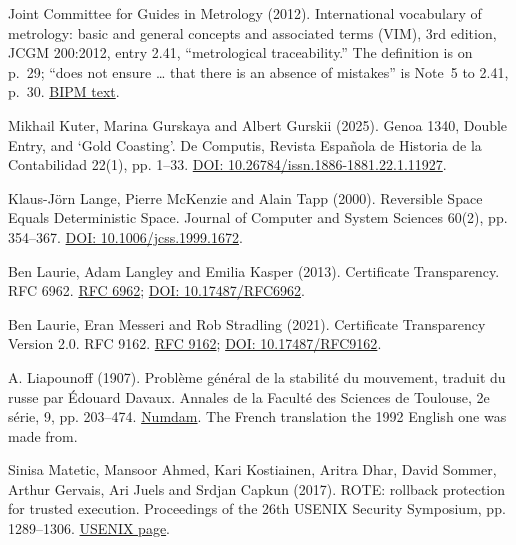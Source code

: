 \documentclass[11pt,twoside]{article}
\theoremstyle{thielethm}
\theoremstyle{thieledef}
\theoremstyle{thieledef}
\theoremstyle{thieledef}
\theoremstyle{thielethm}
\theoremstyle{thieleobs}
\theoremstyle{thielethm}
\begin{document}
\noindent Joint Committee for Guides in Metrology (2012). International vocabulary of metrology: basic and general concepts and associated terms (VIM), 3rd edition, JCGM 200:2012, entry 2.41, ``metrological traceability.'' The definition is on p.~29; ``does not ensure \ldots{} that there is an absence of mistakes'' is Note~5 to 2.41, p.~30. \href{https://www.bipm.org/documents/20126/2071204/JCGM_200_2012.pdf}{BIPM text}.
\par\medskip

\noindent Mikhail Kuter, Marina Gurskaya and Albert Gurskii (2025). Genoa 1340, Double Entry, and `Gold Coasting'. De Computis, Revista Española de Historia de la Contabilidad 22(1), pp. 1--33. \href{https://doi.org/10.26784/issn.1886-1881.22.1.11927}{DOI: 10.26784/issn.1886-1881.22.1.11927}.
\par\medskip

\noindent Klaus-J\"orn Lange, Pierre McKenzie and Alain Tapp (2000). Reversible Space Equals Deterministic Space. Journal of Computer and System Sciences 60(2), pp. 354--367. \href{https://doi.org/10.1006/jcss.1999.1672}{DOI: 10.1006/jcss.1999.1672}.
\par\medskip

\noindent Ben Laurie, Adam Langley and Emilia Kasper (2013). Certificate Transparency. RFC 6962. \href{https://www.rfc-editor.org/rfc/rfc6962.html}{RFC 6962}; \href{https://doi.org/10.17487/RFC6962}{DOI: 10.17487/RFC6962}.
\par\medskip

\noindent Ben Laurie, Eran Messeri and Rob Stradling (2021). Certificate Transparency Version 2.0. RFC 9162. \href{https://www.rfc-editor.org/rfc/rfc9162.html}{RFC 9162}; \href{https://doi.org/10.17487/RFC9162}{DOI: 10.17487/RFC9162}.
\par\medskip

\noindent A. Liapounoff (1907). Problème général de la stabilité du mouvement, traduit du russe par Édouard Davaux. Annales de la Faculté des Sciences de Toulouse, 2e série, 9, pp. 203--474. \href{http://www.numdam.org/item?id=AFST_1907_2_9__203_0}{Numdam}. The French translation the 1992 English one was made from.
\par\medskip

\noindent Sinisa Matetic, Mansoor Ahmed, Kari Kostiainen, Aritra Dhar, David Sommer, Arthur Gervais, Ari Juels and Srdjan Capkun (2017). ROTE: rollback protection for trusted execution. Proceedings of the 26th USENIX Security Symposium, pp. 1289--1306. \href{https://www.usenix.org/conference/usenixsecurity17/technical-sessions/presentation/matetic}{USENIX page}.
\par\medskip
\end{document}
